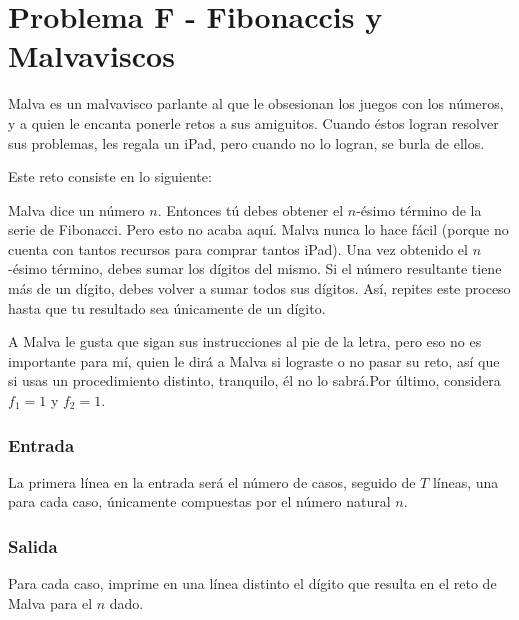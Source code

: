 \chapter*{Problema F - Fibonaccis y Malvaviscos}


Malva es un malvavisco parlante al que le obsesionan los juegos con los números, y a quien le encanta ponerle retos a sus amiguitos. Cuando éstos logran resolver sus problemas, les regala un iPad, pero cuando no lo logran, se burla de ellos. 

Este reto consiste en lo siguiente:

Malva dice un número $n$. Entonces tú debes obtener el $n$-ésimo término
de la serie de Fibonacci. Pero esto no acaba aquí. Malva nunca lo hace fácil
(porque no cuenta con tantos recursos para comprar tantos iPad). Una vez 
obtenido el $n$-ésimo término, debes sumar los dígitos del mismo. Si el número 
resultante tiene más de un dígito, debes volver a sumar todos sus dígitos. 
Así, repites este proceso hasta que tu resultado sea únicamente de un dígito. 

A Malva le gusta que sigan sus instrucciones al pie de la letra, pero eso no es importante para mí, quien le dirá a Malva si lograste o no pasar su reto, así que si usas un procedimiento distinto, tranquilo, él no lo sabrá.Por último, considera $f_1=1$ y $f_2=1$.


\subsection*{Entrada}

La primera línea en la entrada será el número de casos, seguido de $T$ líneas, una para cada caso, únicamente compuestas por el número natural $n$.


\subsection*{Salida}

Para cada caso, imprime en una línea distinto el dígito que resulta en el reto de Malva para el $n$ dado.


